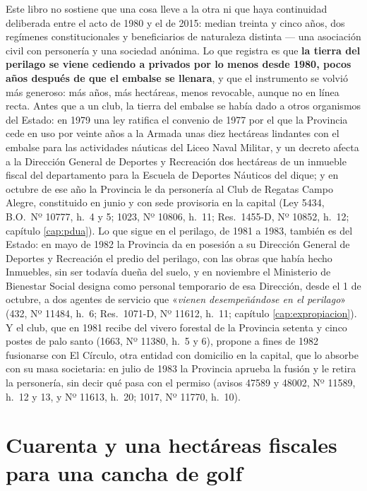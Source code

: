 Este libro no sostiene que una cosa lleve a la otra ni que haya continuidad deliberada entre
el acto de 1980 y el de 2015: median treinta y cinco años, dos regímenes constitucionales y beneficiarios de
naturaleza distinta --- una asociación civil con personería y una sociedad anónima. Lo que
registra es que \textbf{la tierra del perilago se viene cediendo a privados por lo menos desde 1980, pocos años después de que el
embalse se llenara}, y que el instrumento se volvió más generoso: más años, más hectáreas, menos
revocable, aunque no en línea recta. Antes que a un club, la tierra del embalse se había dado a otros organismos del Estado: en 1979 una ley ratifica el convenio de 1977 por el que la Provincia cede en uso por veinte años a la Armada unas diez hectáreas lindantes con el embalse para las actividades náuticas del Liceo Naval Militar, y un decreto afecta a la Dirección General de Deportes y Recreación dos hectáreas de un inmueble fiscal del departamento para la Escuela de Deportes Náuticos del dique; y en octubre de ese año la Provincia le da personería al Club de Regatas Campo Alegre, constituido en junio y con sede provisoria en la capital (Ley 5434, B.O.\ Nº 10777, h.\ 4 y 5; 1023, Nº 10806, h.\ 11; Res.\ 1455-D, Nº 10852, h.\ 12; capítulo \ref{cap:pdua}). Lo que sigue en el perilago, de 1981 a 1983, también es del Estado: en mayo de 1982 la Provincia da en posesión a su Dirección General de Deportes y Recreación el predio del perilago, con las obras que había hecho Inmuebles, sin ser todavía dueña del suelo, y en noviembre el Ministerio de Bienestar Social designa como personal temporario de esa Dirección, desde el 1 de octubre, a dos agentes de servicio que «\textit{vienen desempeñándose en el perilago}» (432, Nº 11484, h.\ 6; Res.\ 1071-D, Nº 11612, h.\ 11; capítulo \ref{cap:expropiacion}). Y el club, que en 1981 recibe del vivero forestal de la Provincia setenta y cinco postes de palo santo (1663, Nº 11380, h.\ 5 y 6), propone a fines de 1982 fusionarse con El Círculo, otra entidad con domicilio en la capital, que lo absorbe con su masa societaria: en julio de 1983 la Provincia aprueba la fusión y le retira la personería, sin decir qué pasa con el permiso (avisos 47589 y 48002, Nº 11589, h.\ 12 y 13, y Nº 11613, h.\ 20; 1017, Nº 11770, h.\ 10).

\section{Cuarenta y una hectáreas fiscales para una cancha de golf}

